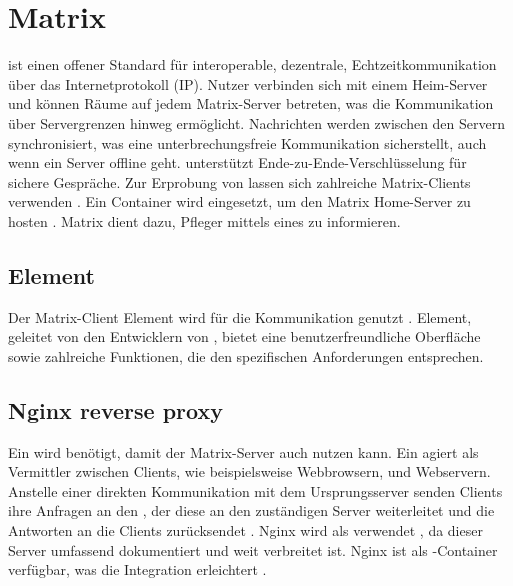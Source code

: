 
\clearpage
\section{Matrix}

 ist einen offener Standard für interoperable, dezentrale, Echtzeitkommunikation über das Internetprotokoll (IP). Nutzer verbinden sich mit einem Heim-Server und können Räume auf jedem Matrix-Server betreten, was die Kommunikation über Servergrenzen hinweg ermöglicht. Nachrichten werden zwischen den Servern synchronisiert, was eine unterbrechungsfreie Kommunikation sicherstellt, auch wenn ein Server offline geht.  unterstützt Ende-zu-Ende-Verschlüsselung für sichere Gespräche. Zur Erprobung von  lassen sich zahlreiche Matrix-Clients verwenden \cite{noauthor_introduction_nodate}. Ein  Container wird eingesetzt, um den Matrix Home-Server zu hosten \cite{noauthor_matrixdotorgsynapse_nodate}. Matrix dient dazu, Pfleger mittels eines  zu informieren.

\subsection{Element}
Der Matrix-Client Element wird für die Kommunikation genutzt \cite{noauthor_element_nodate}. Element, geleitet von den Entwicklern von , bietet eine benutzerfreundliche Oberfläche sowie zahlreiche Funktionen, die den spezifischen Anforderungen entsprechen.

\subsection{Nginx reverse proxy}

Ein  wird benötigt, damit der Matrix-Server auch  nutzen kann. Ein  agiert als Vermittler zwischen Clients, wie beispielsweise Webbrowsern, und Webservern. Anstelle einer direkten Kommunikation mit dem Ursprungsserver senden Clients ihre Anfragen an den , der diese an den zuständigen Server weiterleitet und die Antworten an die Clients zurücksendet \cite{noauthor_was_nodate}. Nginx wird als  verwendet \cite{noauthor_nginx_nodate}, da dieser Server umfassend dokumentiert und weit verbreitet ist. Nginx ist als -Container verfügbar, was die Integration erleichtert \cite{noauthor_nginx_nodate}.


